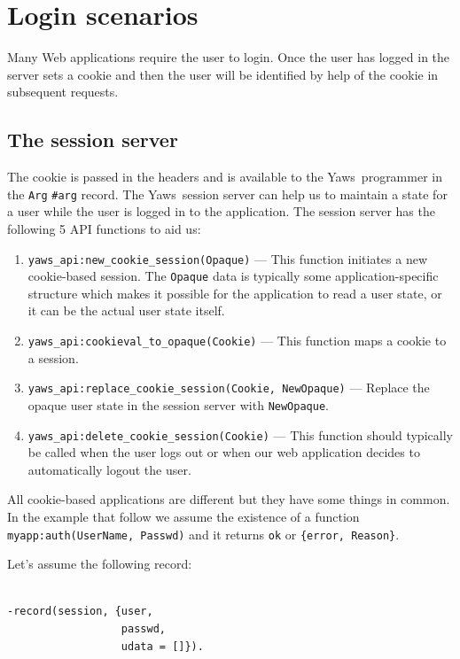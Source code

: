 \documentclass[11pt,oneside,english]{book}
\newcommand{\Yaws}            %
        {{\sc Yaws}}
\begin{document}
\section{Login scenarios}

Many Web applications require the user to login. Once the user has
logged in the server sets a cookie and then the user will be
identified by help of the cookie in subsequent requests.

\subsection{The session server}
The cookie is passed in the headers and is available to the
\Yaws\ programmer in the \verb+Arg+ \verb+#arg+ record. The
\Yaws\ session server can help us to maintain a state for a user while
the user is logged in to the application. The session server has the
following 5 API functions to aid us:

\begin{enumerate}
\item \verb+yaws_api:new_cookie_session(Opaque)+ --- This function
  initiates a new cookie-based session. The \verb+Opaque+ data is
  typically some application-specific structure which makes it
  possible for the application to read a user state, or it can be the
  actual user state itself.

\item \verb+yaws_api:cookieval_to_opaque(Cookie)+ --- This function
  maps a cookie to a session.

\item \verb+yaws_api:replace_cookie_session(Cookie, NewOpaque)+ ---
  Replace the opaque user state in the session server with
  \verb+NewOpaque+.

\item \verb+yaws_api:delete_cookie_session(Cookie)+ --- This function
  should typically be called when the user logs out or when our web
  application decides to automatically logout the user.

\end{enumerate}

All cookie-based applications are different but they have
some things in common. In the example that follow we assume the
existence of a function \verb+myapp:auth(UserName, Passwd)+ and it
returns \verb+ok+ or \verb+{error, Reason}+.

Let's assume the following record:

\begin{verbatim}

-record(session, {user,
                  passwd,
                  udata = []}).

\end{verbatim}
\end{document}
